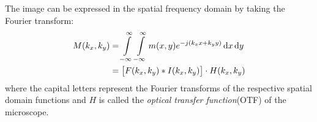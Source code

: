 \documentclass[11pt]{article}
\begin{document}
The image can be expressed in the spatial frequency domain by taking the Fourier transform:
%
\begin{equation}
  \begin{split}
    M(k_x, k_y) &= \int \limits_{-\infty}^{\infty} \int \limits_{-\infty}^{\infty}   m(x,y) e^{-j(k_x x + k_y y)} \mathop{}\!\mathrm{d}{x}\mathop{}\!\mathrm{d}{y} \\
    &=  \left[ F(k_x,k_y) \ast I(k_x,k_y) \right] \cdot H(k_x,k_y)
  \end{split}
  \label{eq:FT}
\end{equation}
%
where the capital letters represent the Fourier transforms of the respective spatial domain functions and $H$ is called the \emph{optical transfer function}(OTF) of the microscope.






\clearpage %


\end{document}
